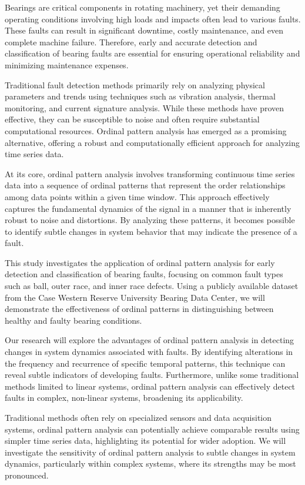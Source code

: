 \documentclass[sn-basic,pdflatex]{sn-jnl}
\theoremstyle{remark}
\theoremstyle{definition}
\begin{document}
Bearings are critical components in rotating machinery, yet their
demanding operating conditions involving high loads and impacts often
lead to various faults. These faults can result in significant downtime,
costly maintenance, and even complete machine failure. Therefore, early
and accurate detection and classification of bearing faults are
essential for ensuring operational reliability and minimizing
maintenance expenses.

Traditional fault detection methods primarily rely on analyzing physical
parameters and trends using techniques such as vibration analysis,
thermal monitoring, and current signature analysis. While these methods
have proven effective, they can be susceptible to noise and often
require substantial computational resources. Ordinal pattern analysis
has emerged as a promising alternative, offering a robust and
computationally efficient approach for analyzing time series data.

At its core, ordinal pattern analysis involves transforming continuous
time series data into a sequence of ordinal patterns that represent the
order relationships among data points within a given time window. This
approach effectively captures the fundamental dynamics of the signal in
a manner that is inherently robust to noise and distortions. By
analyzing these patterns, it becomes possible to identify subtle changes
in system behavior that may indicate the presence of a fault.

This study investigates the application of ordinal pattern analysis for
early detection and classification of bearing faults, focusing on common
fault types such as ball, outer race, and inner race defects. Using a
publicly available dataset from the Case Western Reserve University
Bearing Data Center, we will demonstrate the effectiveness of ordinal
patterns in distinguishing between healthy and faulty bearing
conditions.

Our research will explore the advantages of ordinal pattern analysis in
detecting changes in system dynamics associated with faults. By
identifying alterations in the frequency and recurrence of specific
temporal patterns, this technique can reveal subtle indicators of
developing faults. Furthermore, unlike some traditional methods limited
to linear systems, ordinal pattern analysis can effectively detect
faults in complex, non-linear systems, broadening its applicability.

Traditional methods often rely on specialized sensors and data
acquisition systems, ordinal pattern analysis can potentially achieve
comparable results using simpler time series data, highlighting its
potential for wider adoption. We will investigate the sensitivity of
ordinal pattern analysis to subtle changes in system dynamics,
particularly within complex systems, where its strengths may be most
pronounced.
\end{document}

